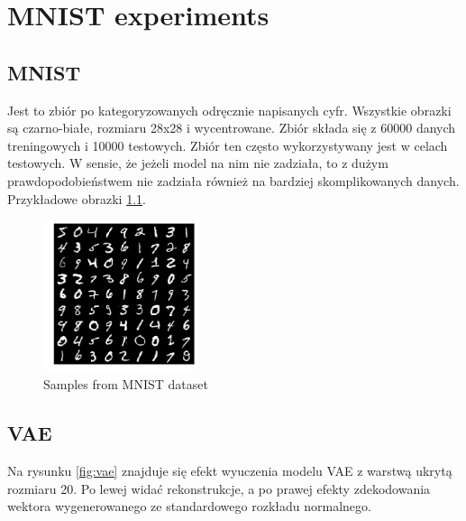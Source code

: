 \chapter{MNIST experiments}

\section{MNIST}

Jest to zbiór po kategoryzowanych odręcznie napisanych cyfr. Wszystkie obrazki są czarno-białe, rozmiaru 28x28 i wycentrowane. Zbiór składa się z 60000 danych treningowych i 10000 testowych. Zbiór ten często wykorzystywany jest w celach testowych. W sensie, że jeżeli model na nim nie zadziała, to z dużym prawdopodobieństwem nie zadziała również na bardziej skomplikowanych danych. Przykładowe obrazki \ref{fig:mnist}.

\begin{figure}[h!]
    \centering
    \includegraphics[width=0.4\textwidth]{images/mnist}
    \caption{Samples from MNIST dataset}
    \label{fig:mnist}
\end{figure}

\section{VAE}

Na rysunku \ref{fig:vae} znajduje się efekt wyuczenia modelu VAE z warstwą ukrytą rozmiaru 20. Po lewej widać rekonstrukcje, a po prawej efekty zdekodowania wektora wygenerowanego ze standardowego rozkładu normalnego.

